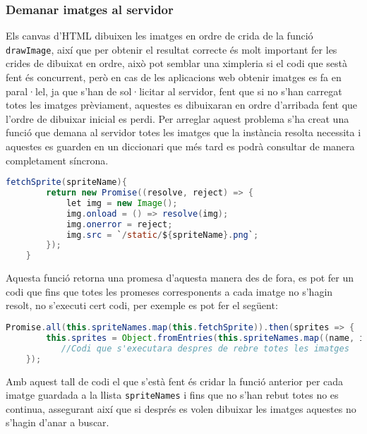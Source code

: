 \subsubsection{Demanar imatges al servidor}
Els canvas d'HTML dibuixen les imatges en ordre de crida de la funció \texttt{drawImage}, així que per obtenir el resultat correcte és molt important fer les crides de dibuixat en ordre, això pot semblar una ximpleria si el codi que sestà fent és concurrent, però en cas de les aplicacions web obtenir imatges es fa en paral·lel, ja que s'han de sol·licitar al servidor, fent que si no s'han carregat totes les imatges prèviament, aquestes es dibuixaran en ordre d'arribada fent que l'ordre de dibuixar inicial es perdi. Per arreglar aquest problema s'ha creat una funció que demana al servidor totes les imatges que la instància resolta necessita i aquestes es guarden en un diccionari que més tard es podrà consultar de manera completament síncrona.\\

\begin{lstlisting}[language=Java, caption=Fetch sprite]
    fetchSprite(spriteName){
        return new Promise((resolve, reject) => {
            let img = new Image();
            img.onload = () => resolve(img);
            img.onerror = reject;
            img.src = `/static/${spriteName}.png`;
        });
    }
\end{lstlisting}

Aquesta funció retorna una promesa d'aquesta manera des de fora, es pot fer un codi que fins que totes les promeses corresponents a cada imatge no s'hagin resolt, no s'executi cert codi, per exemple es pot fer el següent:

\begin{lstlisting}[language=Java, caption=Fetch all sprites]
    Promise.all(this.spriteNames.map(this.fetchSprite)).then(sprites => {
        this.sprites = Object.fromEntries(this.spriteNames.map((name, i) => [name, sprites[i]]));
           //Codi que s'executara despres de rebre totes les imatges
    });
\end{lstlisting}

Amb aquest tall de codi el que s'està fent és cridar la funció anterior per cada imatge guardada a la llista \texttt{spriteNames} i fins que no s'han rebut totes no es continua, assegurant així que si després es volen dibuixar les imatges aquestes no s'hagin d'anar a buscar.

